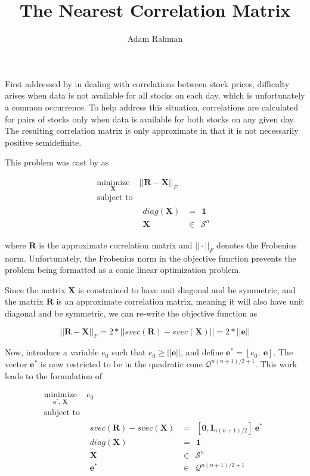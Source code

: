 \documentclass{article}
\author{Adam Rahman}
\title{The Nearest Correlation Matrix}
\newcommand{\ve}[1]{\mathbf{#1}}           %
\newcommand{\m}[1]{\mathbf{#1}}               %
\begin{document}
\maketitle

First addressed by \cite{higham2002computing} in dealing with correlations between stock prices, difficulty arises when data is not available for all stocks on each day, which is unfortunately a common occurrence. To help address this situation, correlations are calculated for pairs of stocks only when data is available for both stocks on any given day. The resulting correlation matrix is only approximate in that it is not necessarily positive semidefinite.

This problem was cast by \cite{higham2002computing} as

\[
\begin{array}{ll}
\underset{\m{X}}{\text{minimize}} & ||\m{R} - \m{X}||_{F}\\
\text{subject to} & \\
& \begin{array}{rl}
diag(\m{X}) &=~~\ve{1} \\
\m{X} &\in~~\mathcal{S}^{n}
\end{array}
\end{array}
\]

\noindent where $\m{R}$ is the approximate correlation matrix and $||\cdot||_{F}$ denotes the Frobenius norm. Unfortunately, the Frobenius norm in the objective function prevents the problem being formatted as a conic linear optimization problem.

Since the matrix $\m{X}$ is constrained to have unit diagonal and be symmetric, and the matrix $\m{R}$ is an approximate correlation matrix, meaning it will also have unit diagonal and be symmetric, we can re-write the objective function as

\[
||\m{R}-\m{X}||_{F} = 2*||svec(\m{R}) - svec(\m{X})|| = 2*||\ve{e}||
\]

Now, introduce a variable $e_{0}$ such that $e_{0} \geq ||\ve{e}||$, and define $\ve{e}^{\ast} = [e_{0};~\ve{e}]$. The vector $\ve{e}^{\ast}$ is now restricted to be in the quadratic cone $\mathcal{Q}^{n(n+1)/2+1}$. This work leads to the formulation of \cite{toh1999sdpt3}

\[
\begin{array}{ll}
\underset{\ve{e}^{\ast},~\m{X}}{\text{minimize}} & e_{0} \\
\text{subject to} & \\
& 
\begin{array}{rl}
svec(\m{R}) - svec(\m{X}) &=~~ [\ve{0}, \m{I}_{n(n+1)/2}]~\ve{e}^{\ast} \\
diag(\m{X}) &=~~\ve{1} \\
\m{X} &\in~~\mathcal{S}^{n} \\
\ve{e}^{\ast} &\in~~\mathcal{Q}^{n(n+1)/2+1}
\end{array}
\end{array}
\]
\end{document}
